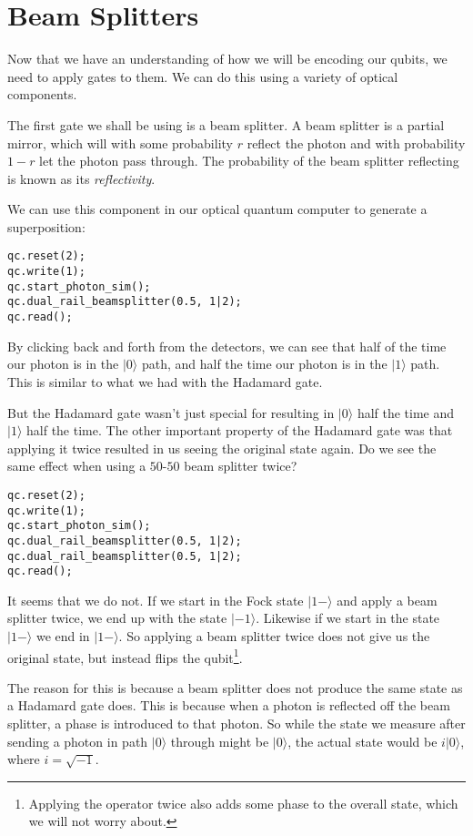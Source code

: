 \documentclass[twocolumn]{article}
\begin{document}
\section{Beam Splitters}

Now that we have an understanding of how we will be encoding our qubits, we need to apply gates to them. We can do this using a variety of optical components.

The first gate we shall be using is a beam splitter. A beam splitter is a partial mirror, which will with some probability $r$ reflect the photon and with probability $1 - r$ let the photon pass through. The probability of the beam splitter reflecting is known as its {\em reflectivity}.

We can use this component in our optical quantum computer to generate a superposition:

\begin{lstlisting}
qc.reset(2);
qc.write(1);
qc.start_photon_sim();
qc.dual_rail_beamsplitter(0.5, 1|2);
qc.read();
\end{lstlisting}

By clicking back and forth from the detectors, we can see that half of the time  our photon is in the $|0\rangle$ path, and half the time our photon is in the $|1\rangle$ path. This is similar to what we had with the Hadamard gate.

But the Hadamard gate wasn't just special for resulting in $|0\rangle$ half the time and $|1\rangle$ half the time. The other important property of the Hadamard gate was that applying it twice resulted in us seeing the original state again. Do we see the same effect when using a $50$-$50$ beam splitter twice?

\begin{lstlisting}
qc.reset(2);
qc.write(1);
qc.start_photon_sim();
qc.dual_rail_beamsplitter(0.5, 1|2);
qc.dual_rail_beamsplitter(0.5, 1|2);
qc.read();
\end{lstlisting}

It seems that we do not. If we start in the Fock state $|1-\rangle$ and apply a beam splitter twice, we end up with the state $|-1\rangle$. Likewise if we start in the state $|1-\rangle$ we end in $|1-\rangle$. So applying a beam splitter twice does not give us the original state, but instead flips the qubit\footnote{Applying the operator twice also adds some phase to the overall state, which we will not worry about.}.

The reason for this is because a beam splitter does not produce the same state as a Hadamard gate does. This is because when a photon is reflected off the beam splitter, a phase is introduced to that photon. So while the state we measure after sending a photon in path $|0\rangle$ through might be $|0\rangle$, the actual state would be $i|0\rangle$, where $i = \sqrt{-1}$.
\end{document}
